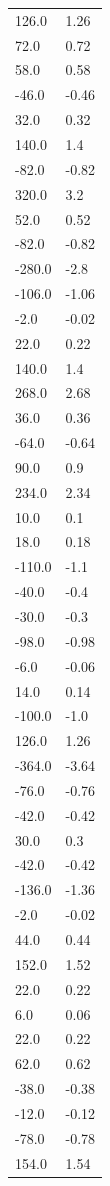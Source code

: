\begin{longtable}{ll}
126.0 & 1.26 \\
72.0 & 0.72 \\
58.0 & 0.58 \\
-46.0 & -0.46 \\
32.0 & 0.32 \\
140.0 & 1.4 \\
-82.0 & -0.82 \\
320.0 & 3.2 \\
52.0 & 0.52 \\
-82.0 & -0.82 \\
-280.0 & -2.8 \\
-106.0 & -1.06 \\
-2.0 & -0.02 \\
22.0 & 0.22 \\
140.0 & 1.4 \\
268.0 & 2.68 \\
36.0 & 0.36 \\
-64.0 & -0.64 \\
90.0 & 0.9 \\
234.0 & 2.34 \\
10.0 & 0.1 \\
18.0 & 0.18 \\
-110.0 & -1.1 \\
-40.0 & -0.4 \\
-30.0 & -0.3 \\
-98.0 & -0.98 \\
-6.0 & -0.06 \\
14.0 & 0.14 \\
-100.0 & -1.0 \\
126.0 & 1.26 \\
-364.0 & -3.64 \\
-76.0 & -0.76 \\
-42.0 & -0.42 \\
30.0 & 0.3 \\
-42.0 & -0.42 \\
-136.0 & -1.36 \\
-2.0 & -0.02 \\
44.0 & 0.44 \\
152.0 & 1.52 \\
22.0 & 0.22 \\
6.0 & 0.06 \\
22.0 & 0.22 \\
62.0 & 0.62 \\
-38.0 & -0.38 \\
-12.0 & -0.12 \\
-78.0 & -0.78 \\
154.0 & 1.54 \\

\end{longtable}
